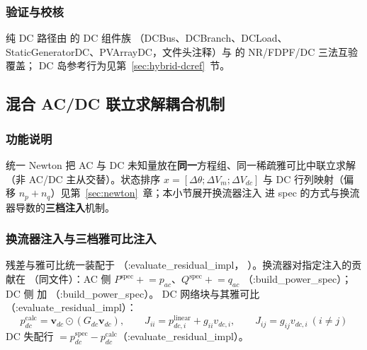 \subsubsection*{验证与校核}
纯 DC 路径由  的 DC 组件族
（DCBus、DCBranch、DCLoad、StaticGeneratorDC、PVArrayDC，文件头注释）与
 的 NR/FDPF/DC 三法互验覆盖；
DC 岛参考行为见第~\ref{sec:hybrid-dcref}~节。

\subsection{混合 AC/DC 联立求解耦合机制}

\subsubsection*{功能说明}
统一 Newton 把 AC 与 DC 未知量放在\textbf{同一}方程组、同一稀疏雅可比中联立求解
（非 AC/DC 主从交替）。状态排序 $x=[\Delta\theta;\Delta V_m;\Delta V_{dc}]$ 与
DC 行列映射（偏移 $n_p+n_q$）见第~\ref{sec:newton}~章；本小节展开换流器注入
进 spec 的方式与换流器导数的\textbf{三档注入}机制。

\subsubsection*{换流器注入与三档雅可比注入}
残差与雅可比统一装配于 （:evaluate\_residual\_impl，
）。换流器对指定注入的贡献在
（同文件）：AC 侧
$P^{\mathrm{spec}} \mathrel{+}=p_{ac}$、$Q^{\mathrm{spec}}\mathrel{+}=q_{ac}$
（:build\_power\_spec）；DC 侧  加 （:build\_power\_spec）。
DC 网络块与其雅可比（:evaluate\_residual\_impl）：
\[
p_{dc}^{\mathrm{calc}}=\mathbf v_{dc}\odot(G_{dc}\mathbf v_{dc}),\qquad
J_{ii}=p_{dc,i}^{\mathrm{linear}}+g_{ii}v_{dc,i},\qquad
J_{ij}=g_{ij}v_{dc,i}\ (i\neq j)
\]
DC 失配行 $=p_{dc}^{\mathrm{spec}}-p_{dc}^{\mathrm{calc}}$（:evaluate\_residual\_impl）。

